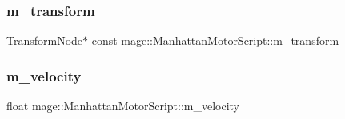 \subsubsection{\texorpdfstring{m\+\_\+transform}{m\_transform}}
{\footnotesize\ttfamily \hyperlink{structmage_1_1_transform_node}{Transform\+Node}$\ast$ const mage\+::\+Manhattan\+Motor\+Script\+::m\+\_\+transform\hspace{0.3cm}{\ttfamily [private]}}

\hypertarget{classmage_1_1_manhattan_motor_script_a824893c374fa6f271a964751dc1a59ec}{}\label{classmage_1_1_manhattan_motor_script_a824893c374fa6f271a964751dc1a59ec} 
\subsubsection{\texorpdfstring{m\+\_\+velocity}{m\_velocity}}
{\footnotesize\ttfamily float mage\+::\+Manhattan\+Motor\+Script\+::m\+\_\+velocity\hspace{0.3cm}{\ttfamily [private]}}

